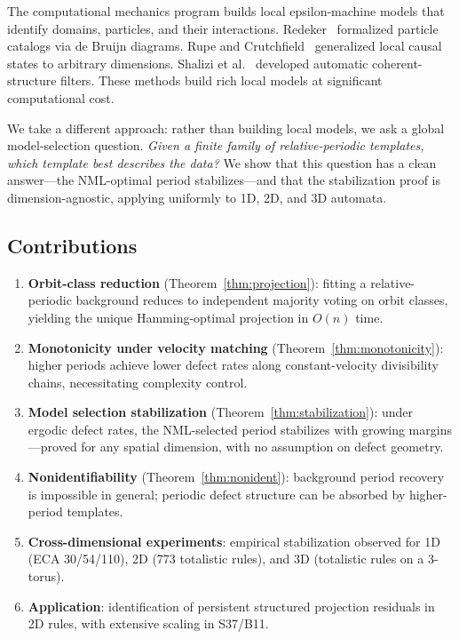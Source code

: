 \documentclass[11pt]{article}
\theoremstyle{definition}
\theoremstyle{remark}
\begin{document}
The computational mechanics program \cite{crutchfield1997,hanson1992} builds local epsilon-machine models that identify domains, particles, and their interactions.
Redeker~\cite{redeker2017} formalized particle catalogs via de Bruijn diagrams.
Rupe and Crutchfield~\cite{rupe2018} generalized local causal states to arbitrary dimensions.
Shalizi et al.~\cite{shalizi2006} developed automatic coherent-structure filters.
These methods build rich local models at significant computational cost.

We take a different approach: rather than building local models, we ask a global model-selection question.
\emph{Given a finite family of relative-periodic templates, which template best describes the data?}
We show that this question has a clean answer---the NML-optimal period stabilizes---and that the stabilization proof is dimension-agnostic, applying uniformly to 1D, 2D, and 3D automata.

\subsection{Contributions}

\begin{enumerate}
    \item \textbf{Orbit-class reduction} (Theorem~\ref{thm:projection}): fitting a relative-periodic background reduces to independent majority voting on orbit classes, yielding the unique Hamming-optimal projection in $O(n)$ time.
    \item \textbf{Monotonicity under velocity matching} (Theorem~\ref{thm:monotonicity}): higher periods achieve lower defect rates along constant-velocity divisibility chains, necessitating complexity control.
    \item \textbf{Model selection stabilization} (Theorem~\ref{thm:stabilization}): under ergodic defect rates, the NML-selected period stabilizes with growing margins---proved for any spatial dimension, with no assumption on defect geometry.
    \item \textbf{Nonidentifiability} (Theorem~\ref{thm:nonident}): background period recovery is impossible in general; periodic defect structure can be absorbed by higher-period templates.
    \item \textbf{Cross-dimensional experiments}: empirical stabilization observed for 1D (ECA 30/54/110), 2D (773 totalistic rules), and 3D (totalistic rules on a 3-torus).
    \item \textbf{Application}: identification of persistent structured projection residuals in 2D rules, with extensive scaling in S37/B11.
\end{enumerate}
\end{document}
